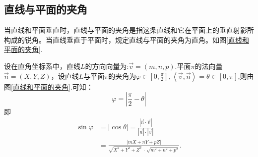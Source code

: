 \subsection{直线与平面的夹角}
\quad 当直线和平面垂直时，{\color{dy}直线与平面的夹角}是指这条直线和它在平面上的垂直射影所构成的{\color{dy2}锐角}。当直线垂直于平面时，规定{\color{dy}直线与平面的夹角}为{\color{dy2}直角}。如图\ref{直线和平面的夹角}.

\theorem[直线与平面的夹角]
\quad 设在{\color{dy}直角坐标系}中，直线$L$的方向向量为:$\overrightarrow{v}=(m,n,p).$平面$\pi $的法向量$\overrightarrow{n}=(X,Y,Z)$，设直线$L$与平面$\pi $的夹角为$\varphi \in \displaystyle \left[ 0,\frac{\pi }{2} \right],\left\langle \overrightarrow{v},\overrightarrow{n}\right\rangle =\theta \in \displaystyle \left[ 0,\pi  \right]$,则由图\ref{直线和平面的夹角}.可知：
$$\varphi =\left| \frac{\pi }{2}-\theta \right| $$
即
\begin{equation}
\begin{split}
\sin \varphi &=|\cos \theta |=\frac{|\overrightarrow{n} \cdot \overrightarrow{v} |}{|\overrightarrow{n}| \cdot |\overrightarrow{v}|}\\
&=\frac{\left| mX+nY+pZ\right| }{\sqrt{X^2+Y^2+Z^2}\,\cdot \,\sqrt{m^2+n^2+p^2}}.
\end{split}
\end{equation} 
